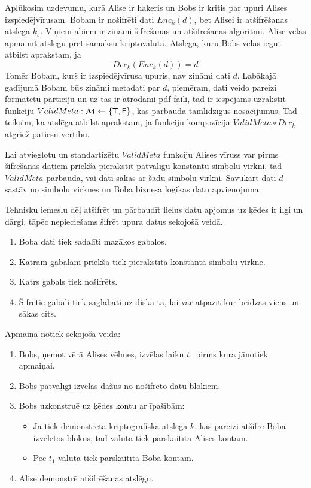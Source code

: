 Aplūkosim uzdevumu, kurā Alise ir hakeris un Bobs ir kritis par upuri Alises izspiedējvīrusam.
Bobam ir nošifrēti dati $Enc_k(d)$, bet Alisei ir atšifrēšanas atslēga $k_s$. Viņiem abiem ir zināmi šifrēšanas un atšifrēšanas algoritmi. Alise vēlas apmainīt atslēgu pret samaksu kriptovalūtā. Atslēga, kuru Bobs vēlas iegūt atbilst aprakstam, ja
\begin{equation*}
    Dec_k(Enc_k(d)) = d
\end{equation*}
Tomēr Bobam, kurš ir izspiedējvīrusa upuris, nav zināmi dati $d$. Labākajā gadījumā Bobam būs zināmi metadati par $d$, piemēram, dati veido pareizi formatētu partīciju un uz tās ir atrodami pdf faili, tad ir iespējams uzrakstīt funkciju $ValidMeta: \mathcal{M} \leftarrow \left\{ \textsf{T},\textsf{F} \right\}$, kas pārbauda tamlīdzīgus nosacījumus. Tad teiksim, ka atslēga atbilst aprakstam, ja funkciju kompozīcija $ValidMeta \circ Dec_k$ atgriež patiesu vērtību.

Lai atvieglotu un standartizētu $ValidMeta$ funkciju Alises vīruss var pirms šifrēšanas datiem priekšā pierakstīt patvaļīgu konstantu simbolu virkni, tad $ValidMeta$ pārbauda, vai dati sākas ar šādu simbolu virkni. Savukārt dati $d$ sastāv no simbolu virknes un Boba biznesa loģikas datu apvienojuma.

Tehnisku iemeslu dēļ atšifrēt un pārbaudīt lielus datu apjomus uz ķēdes ir ilgi un dārgi, tāpēc nepieciešams šifrēt upura datus sekojošā veidā.
\begin{enumerate}
    \item Boba dati tiek sadalīti mazākos gabalos.
    \item Katram gabalam priekšā tiek pierakstīta konstanta simbolu virkne.
    \item Katrs gabals tiek nošifrēts.
    \item Šifrētie gabali tiek saglabāti uz diska tā, lai var atpazīt kur beidzas viens un sākas cits.
\end{enumerate}
Apmaiņa notiek sekojošā veidā:
\begin{enumerate}
    \item Bobs, ņemot vērā Alises vēlmes, izvēlas laiku $t_1$ pirms kura jānotiek apmaiņai.
    \item Bobs patvaļīgi izvēlas dažus no nošifrēto datu blokiem.
    \item Bobs uzkonstruē uz ķēdes kontu ar īpašībām:
        \begin{itemize}
            \item Ja tiek demonstrēta kriptogrāfiska atslēga $k$, kas pareizi atšifrē Boba izvēlētos blokus, tad valūta tiek pārskaitīta Alises kontam.
            \item Pēc $t_1$ valūta tiek pārskaitīta Boba kontam.
        \end{itemize}
    \item Alise demonstrē atšifrēšanas atslēgu.
\end{enumerate}
